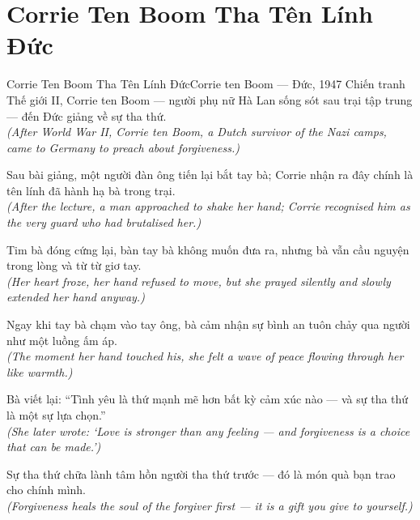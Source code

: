 \section{Corrie Ten Boom Tha Tên Lính Đức}
\begin{truyen}{Corrie Ten Boom Tha Tên Lính Đức}{Corrie ten Boom --- Đức, 1947}
 Chiến tranh Thế giới II, Corrie ten Boom --- người phụ nữ Hà Lan sống sót sau trại tập trung --- đến Đức giảng về sự tha thứ.\\[4pt]
\textit{(After World War II, Corrie ten Boom, a Dutch survivor of the Nazi camps, came to Germany to preach about forgiveness.)}

Sau bài giảng, một người đàn ông tiến lại bắt tay bà; Corrie nhận ra đây chính là tên lính đã hành hạ bà trong trại.\\[4pt]
\textit{(After the lecture, a man approached to shake her hand; Corrie recognised him as the very guard who had brutalised her.)}

Tim bà đóng cứng lại, bàn tay bà không muốn đưa ra, nhưng bà vẫn cầu nguyện trong lòng và từ từ giơ tay.\\[4pt]
\textit{(Her heart froze, her hand refused to move, but she prayed silently and slowly extended her hand anyway.)}

Ngay khi tay bà chạm vào tay ông, bà cảm nhận sự bình an tuôn chảy qua người như một luồng ấm áp.\\[4pt]
\textit{(The moment her hand touched his, she felt a wave of peace flowing through her like warmth.)}

Bà viết lại: ``Tình yêu là thứ mạnh mẽ hơn bất kỳ cảm xúc nào --- và sự tha thứ là một sự lựa chọn.''\\[4pt]
\textit{(She later wrote: `Love is stronger than any feeling --- and forgiveness is a choice that can be made.')}

\end{truyen}
\begin{baihoc}
  Sự tha thứ chữa lành tâm hồn người tha thứ trước --- đó là món quà bạn trao cho chính mình.\\[4pt]
  \textit{(Forgiveness heals the soul of the forgiver first --- it is a gift you give to yourself.)}
\end{baihoc}

